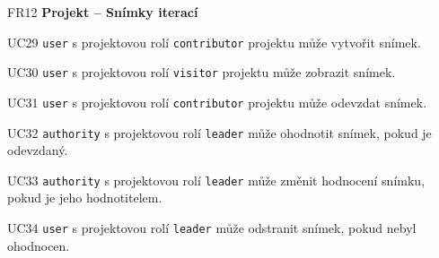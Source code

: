 \begin{dlnar}
   \item[FR12] \textbf{Projekt -- Snímky iterací}
 
   \begin{dlnar}
      \item[UC29]
      \texttt{user} s projektovou rolí \texttt{contributor} projektu může vytvořit snímek.

      \item[UC30] 
      \texttt{user} s projektovou rolí \texttt{visitor} projektu může zobrazit snímek.

      \item[UC31] 
      \texttt{user} s projektovou rolí \texttt{contributor} projektu může odevzdat snímek.

      \item[UC32]
      \texttt{authority} s projektovou rolí \texttt{leader} může ohodnotit snímek, pokud je odevzdaný.
      
      \item[UC33]
      \texttt{authority} s projektovou rolí \texttt{leader} může změnit hodnocení snímku, pokud je jeho hodnotitelem.

      \item[UC34]
      \texttt{user} s projektovou rolí \texttt{leader} může odstranit snímek, pokud nebyl ohodnocen.  
   \end{dlnar}
\end{dlnar}
